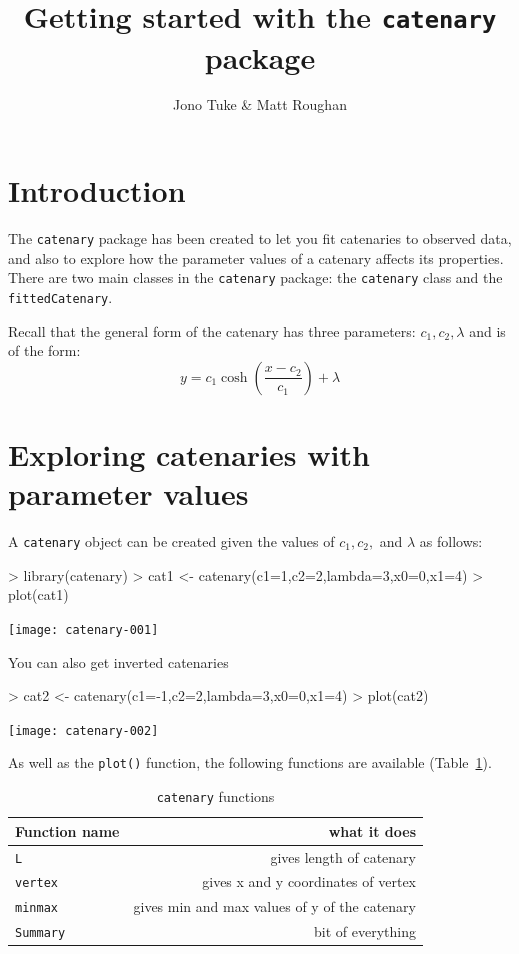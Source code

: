 \documentclass{article}
\author{Jono Tuke \& Matt Roughan}
\title{Getting started with the {\tt catenary} package }
\begin{document}

\maketitle

\section{Introduction}
The {\tt catenary} package has been created to let you fit catenaries to observed data, and also to explore how the parameter values of a catenary affects its properties. There are two main classes in the {\tt catenary} package: the {\tt catenary} class and the {\tt fittedCatenary}. 

Recall that the general form of the catenary has three parameters: $c_1,c_2,\lambda$ and is of the form:
\[
 y = c_1  \cosh\left( \frac{x-c_2}{c_1} \right) + \lambda
\]

\section{ Exploring catenaries with parameter values}
A {\tt catenary} object can be created given the values of $c_1, c_2, $ and $\lambda$ as follows:
\begin{Schunk}
\begin{Sinput}
> library(catenary)
> cat1 <- catenary(c1=1,c2=2,lambda=3,x0=0,x1=4)
> plot(cat1)
\end{Sinput}
\end{Schunk}
\texttt{[image: catenary-001]}

You can also get inverted catenaries
\begin{Schunk}
\begin{Sinput}
> cat2 <- catenary(c1=-1,c2=2,lambda=3,x0=0,x1=4)
> plot(cat2)
\end{Sinput}
\end{Schunk}
\texttt{[image: catenary-002]}

As well as the {\tt plot()} function, the following functions are available (Table~\ref{tab:functions}).

\begin{center}
\begin{table}
\begin{tabular}{l|r}
Function name & what it does \\\hline
{\tt L} & gives length of catenary\\
{\tt vertex} & gives x and y coordinates of vertex\\
{\tt minmax} & gives min and max values of y of the catenary\\
{\tt Summary} & bit of everything
\end{tabular}
\caption{{\tt catenary} functions}
\label{tab:functions}
\end{table}
\end{center}
\end{document}
